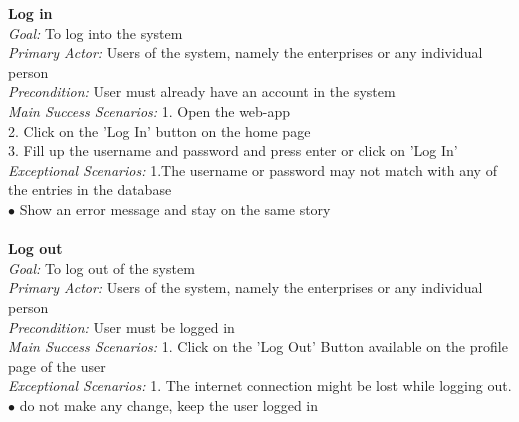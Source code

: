 \documentclass{scrreprt}
\begin{document}
 \textbf{Log in}\\
\textit{Goal: } To log into the system\\
\textit{Primary Actor: } Users of the system, namely the enterprises or any individual person\\
\textit{Precondition: }User must already have an account in the system\\
\textit{Main Success Scenarios:} 1. Open the web-app\\
2. Click on the 'Log In' button on the home page\\
3. Fill up the username and password and press enter or click on 'Log In'\\
\textit{Exceptional Scenarios:} 1.The username or password may not match with any of the entries in the database\\
$\bullet$ Show an error message and stay on the same story\\\\


 \textbf{Log out}\\
\textit{Goal: } To log out of the system\\
\textit{Primary Actor: } Users of the system, namely the enterprises or any individual person\\
\textit{Precondition: }User must be logged in\\
\textit{Main Success Scenarios:} 1. Click on the 'Log Out' Button available on the profile page of the user\\
\textit{Exceptional Scenarios:} 1. The internet connection might be lost while logging out.\\
$\bullet$ do not make any change, keep the user logged in\\\\
\end{document}
